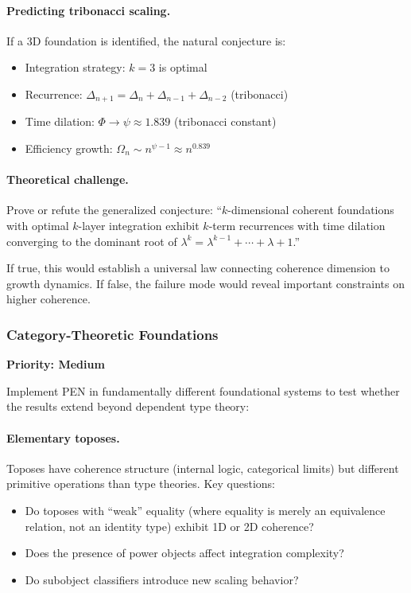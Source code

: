 \documentclass[11pt]{article}
\theoremstyle{definition}
\theoremstyle{remark}
\begin{document}
\paragraph{Predicting tribonacci scaling.}
If a 3D foundation is identified, the natural conjecture is:
\begin{itemize}
\item Integration strategy: $k = 3$ is optimal
\item Recurrence: $\Delta_{n+1} = \Delta_n + \Delta_{n-1} + \Delta_{n-2}$ (tribonacci)
\item Time dilation: $\Phi \to \psi \approx 1.839$ (tribonacci constant)
\item Efficiency growth: $\Omega_n \sim n^{\psi - 1} \approx n^{0.839}$
\end{itemize}

\paragraph{Theoretical challenge.}
Prove or refute the generalized conjecture: ``$k$-dimensional coherent foundations with optimal
$k$-layer integration exhibit $k$-term recurrences with time dilation converging to the dominant root
of $\lambda^k = \lambda^{k-1} + \cdots + \lambda + 1$.''

If true, this would establish a universal law connecting coherence dimension to growth dynamics.
If false, the failure mode would reveal important constraints on higher coherence.

\subsubsection{Category-Theoretic Foundations}

\textbf{Priority: Medium}

Implement PEN in fundamentally different foundational systems to test whether the results extend
beyond dependent type theory:

\paragraph{Elementary toposes.}
Toposes have coherence structure (internal logic, categorical limits) but different primitive operations
than type theories. Key questions:
\begin{itemize}
\item Do toposes with ``weak'' equality (where equality is merely an equivalence relation, not an
identity type) exhibit 1D or 2D coherence?
\item Does the presence of power objects affect integration complexity?
\item Do subobject classifiers introduce new scaling behavior?
\end{itemize}
\end{document}
